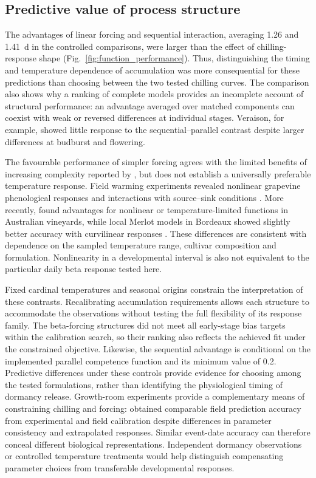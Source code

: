 \documentclass[a4paper,12pt]{article}
\let\OriginalSubsection\subsection
\renewcommand{\subsection}{\FloatBarrier\OriginalSubsection}
\begin{document}
\subsection{Predictive value of process structure}

The advantages of linear forcing and sequential interaction, averaging 1.26 and 1.41~d in the controlled comparisons, were larger than the effect of chilling-response shape (Fig.~\ref{fig:function_performance}). Thus, distinguishing the timing and temperature dependence of accumulation was more consequential for these predictions than choosing between the two tested chilling curves. The comparison also shows why a ranking of complete models provides an incomplete account of structural performance: an advantage averaged over matched components can coexist with weak or reversed differences at individual stages. Veraison, for example, showed little response to the sequential--parallel contrast despite larger differences at budburst and flowering.

The favourable performance of simpler forcing agrees with the limited benefits of increasing complexity reported by \citet{filaComparisonDifferentModelling2014}, but does not establish a universally preferable temperature response. Field warming experiments revealed nonlinear grapevine phenological responses and interactions with source--sink conditions \citep{sadrasNonlinearEffectsElevated2013}. More recently, \citet{thomasDevelopingTestingWinegrape2026} found advantages for nonlinear or temperature-limited functions in Australian vineyards, while local Merlot models in Bordeaux showed slightly better accuracy with curvilinear responses \citep{deresseguierModelingGrapevinePhenology2026}. These differences are consistent with dependence on the sampled temperature range, cultivar composition and formulation. Nonlinearity in a developmental interval is also not equivalent to the particular daily beta response tested here.

Fixed cardinal temperatures and seasonal origins constrain the interpretation of these contrasts. Recalibrating accumulation requirements allows each structure to accommodate the observations without testing the full flexibility of its response family. The beta-forcing structures did not meet all early-stage bias targets within the calibration search, so their ranking also reflects the achieved fit under the constrained objective. Likewise, the sequential advantage is conditional on the implemented parallel competence function and its minimum value of 0.2. Predictive differences under these controls provide evidence for choosing among the tested formulations, rather than identifying the physiological timing of dormancy release. Growth-room experiments provide a complementary means of constraining chilling and forcing: \citet{filaCalibrationValidationGrapevine2012} obtained comparable field prediction accuracy from experimental and field calibration despite differences in parameter consistency and extrapolated responses. Similar event-date accuracy can therefore conceal different biological representations. Independent dormancy observations or controlled temperature treatments would help distinguish compensating parameter choices from transferable developmental responses.
\end{document}
